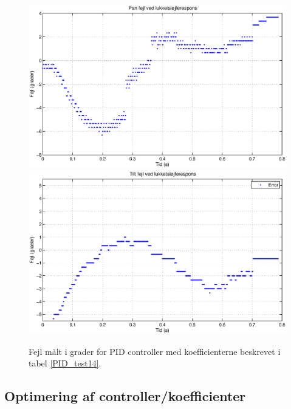 \begin{figure}
\includegraphics[width=1\textwidth]{./graphics/error_pan.eps}
\includegraphics[width=1\textwidth]{./graphics/error_tilt.eps}
\caption[PID controller koefficienter]{Fejl målt i grader for PID controller med koefficienterne beskrevet i tabel \ref{PID_test14}.} \label{PID_test14_plot}
\end{figure}


\subsection{Optimering af controller/koefficienter}

